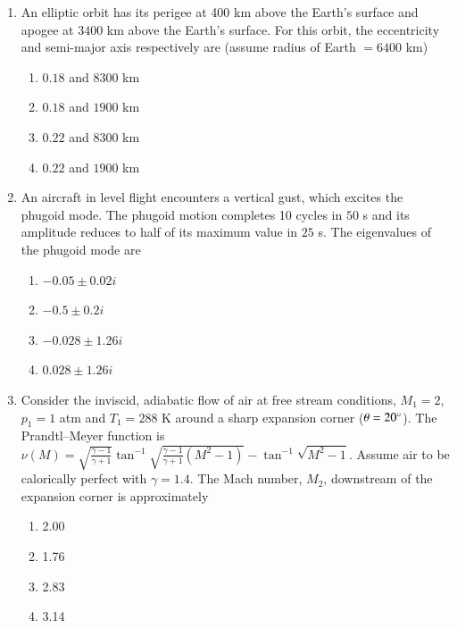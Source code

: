 \documentclass{article}
\begin{document}
\begin{enumerate}
\item An elliptic orbit has its perigee at 400 km above the Earth’s surface and apogee at $3400$ km above the Earth’s surface. For this orbit, the eccentricity and semi-major axis respectively are (assume radius of Earth $=6400$ km)
\begin{multicols}{2}
\begin{enumerate}
\item $0.18$ and $8300$ km
\item $0.18$ and $1900$ km
\item $0.22$ and $8300$ km
\item $0.22$ and $1900$ km
\end{enumerate}
\end{multicols}

\item An aircraft in level flight encounters a vertical gust, which excites the phugoid mode. The phugoid motion completes 10 cycles in $50$ s and its amplitude reduces to half of its maximum value in $25$ s. The eigenvalues of the phugoid mode are
\begin{multicols}{4}
\begin{enumerate}
\item $-0.05 \pm 0.02i$
\item $-0.5 \pm 0.2i$
\item $-0.028 \pm 1.26i$
\item $0.028 \pm 1.26i$
\end{enumerate}
\end{multicols}

\item Consider the inviscid, adiabatic flow of air at free stream conditions, $M_1=2$, $p_1=1$ atm and $T_1=288$ K around a sharp expansion corner ($\theta=20\degree$). The Prandtl–Meyer function is $\nu(M)=\sqrt{\frac{\gamma-1}{\gamma+1}}\tan^{-1}\!\sqrt{\frac{\gamma-1}{\gamma+1}(M^2-1)} - \tan^{-1}\sqrt{M^2-1}$. Assume air to be calorically perfect with $\gamma=1.4$. The Mach number, $M_2$, downstream of the expansion corner is approximately
\begin{figure}[H]
    \centering
    
    \caption{}
    \label{fig:q44}
\end{figure}
\begin{multicols}{4}
\begin{enumerate}
\item 2.00
\item 1.76
\item 2.83
\item 3.14
\end{enumerate}
\end{multicols}


\end{enumerate}
\end{document}
